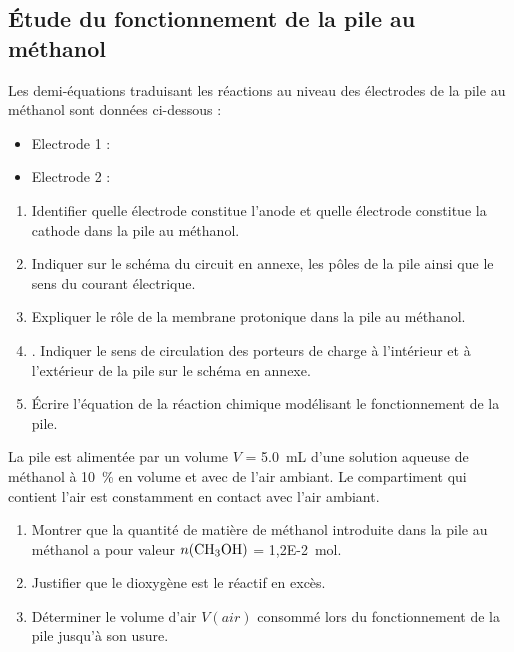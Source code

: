 \documentclass[a4paper,12pt,fleqn]{article}%
\begin{document}
\subsection{Étude du fonctionnement de la pile au méthanol}
Les demi-équations traduisant les réactions au niveau des électrodes de la pile au méthanol sont données ci-dessous :
\begin{itemize}
    \item Electrode 1 : 
    \item Electrode 2 : 
\end{itemize}
\begin{enumerate}
    \item Identifier quelle électrode constitue l’anode et quelle électrode constitue la cathode dans la pile au méthanol.
    \item Indiquer sur le schéma du circuit en annexe, les pôles de la pile ainsi que le sens du courant électrique.
    \item Expliquer le rôle de la membrane protonique dans la pile au méthanol.
    \item . Indiquer le sens de circulation des porteurs de charge à l’intérieur et à l’extérieur de la pile sur le schéma en annexe.
    \item Écrire l'équation de la réaction chimique modélisant le fonctionnement de la pile.
\end{enumerate}
La pile est alimentée par un volume $V$ = \SI{5,0}{mL} d'une solution aqueuse de méthanol à \SI{10}{\percent} en volume et avec de l'air ambiant. Le compartiment qui contient l'air est constamment en contact avec l'air ambiant.

\begin{enumerate}[resume]
    \item Montrer que la quantité de matière de méthanol introduite dans la pile au méthanol a pour valeur $n(\ce{CH3OH})$ = \SI{1,2E-2}{\mole}.
    \item Justifier que le dioxygène est le  réactif en excès.
    \item Déterminer le volume d'air $V(air)$ consommé lors du fonctionnement de la pile jusqu'à son usure.
\end{enumerate}
\end{document}
